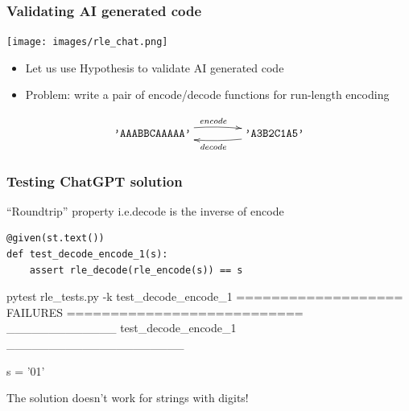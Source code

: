 \documentclass{beamer}
\begin{document}
\begin{frame}[allowframebreaks]
  \frametitle{Validating AI generated code}

    \begin{center}
\texttt{[image: images/rle\_chat.png]}
  \end{center}
  
  \begin{itemize}
  \item Let us use Hypothesis to validate AI generated code
  \item Problem: write a pair of encode/decode functions
    for \alert{run-length encoding}   
  \end{itemize}

  \[ \xymatrix@-0.5pc {
      \texttt{'AAABBCAAAAA'}\ar@/^/[rr]^{encode} &
      & \texttt{'A3B2C1A5'}\ar@/^/[ll]^{decode}
    }
  \]

\end{frame}

\begin{frame}[fragile]
  \frametitle{Testing ChatGPT solution}

  \begin{block}{``Roundtrip'' property i.e.\@ decode is the inverse of encode}
\begin{verbatim}
@given(st.text())
def test_decode_encode_1(s):
    assert rle_decode(rle_encode(s)) == s
\end{verbatim}
    \end{block}\pause


\begin{semiverbatim}
pytest rle_tests.py -k test_decode_encode_1
=================== FAILURES ===========================
\alert{_____________ test_decode_encode_1 _____________________}

s = '01'
\end{semiverbatim}

The solution doesn't work for strings with digits!
  
\end{frame}
\end{document}
